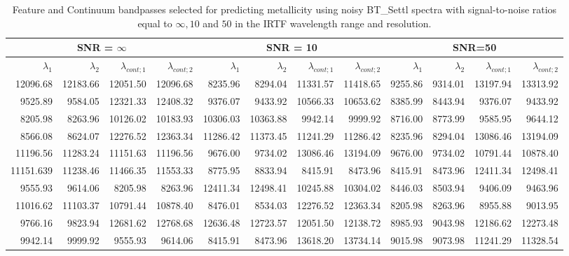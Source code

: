 \begin{table*}
\begin{center}
\begin{tabular}{ rrrr | rrrr | rrrr }
  \hline
  \multicolumn{4}{c}{SNR = $\infty$ } & \multicolumn{4}{c}{SNR = 10} &  \multicolumn{4}{c}{SNR=50} \\
  \hline
$\lambda_1$ & $\lambda_2$ & $\lambda_{cont;1}$ & $\lambda_{cont;2} $ & $\lambda_1$ & $\lambda_2$ & $\lambda_{cont;1}$ & $\lambda_{cont;2} $ & $\lambda_1$ & $\lambda_2$ & $\lambda_{cont;1}$ & $\lambda_{cont;2} $ \\ 
  \hline

     12096.68 & 12183.66  & 12051.50 & 12096.68 & 8235.96  & 8294.04  &	11331.57 & 11418.65 & 9255.86 & 9314.01   &     13197.94 & 13313.92  \\
    9525.89 & 9584.05 	  & 12321.33 & 12408.32 & 9376.07  & 9433.92  &	10566.33 & 10653.62 & 8385.99 & 8443.94   &     9376.07  & 9433.92    \\
     8205.98 & 8263.96 	  & 10126.02 & 10183.93 & 10306.03 & 10363.88 &	 9942.14 & 9999.92  & 8716.00 & 8773.99   &     9585.95  & 9644.12    \\
     8566.08 & 8624.07 	  & 12276.52 & 12363.34 & 11286.42 & 11373.45 &	11241.29 & 11286.42 & 8235.96 & 8294.04   &     13086.46 & 13194.09  \\
     11196.56 & 11283.24  & 11151.63 & 11196.56 & 9676.00  & 9734.02  &	13086.46 & 13194.09 & 9676.00 & 9734.02   &     10791.44 & 10878.40  \\
     11151.639 & 11238.46 & 11466.35 & 11553.33 & 8775.95  & 8833.94  &	8415.91  & 8473.96  & 8415.91 & 8473.96   &     12411.34 & 12498.41  \\
     9555.93 & 9614.06 	  & 8205.98  & 8263.96  & 12411.34 & 12498.41 &	10245.88 & 10304.02 & 8446.03 & 8503.94   &     9406.09  & 9463.96    \\
     11016.62 & 11103.37  & 10791.44 & 10878.40 & 8476.01  & 8534.03  &	12276.52 & 12363.34 & 8205.98 & 8263.96   &     8955.88  & 9013.95    \\
     9766.16 & 9823.94 	  & 12681.62 & 12768.68 & 12636.48 & 12723.57 &	12051.50 & 12138.72 & 8985.93 & 9043.98   &     12186.62 & 12273.48  \\
     9942.14 & 9999.92    & 9555.93  & 9614.06  & 8415.91  & 8473.96  &	13618.20 & 13734.14 & 9015.98 & 9073.98   &     11241.29 & 11328.54  \\

\hline
\end{tabular}
\caption {Feature and Continuum bandpasses selected for predicting metallicity 
      using noisy BT\_Settl spectra with signal-to-noise ratios
      equal to $\infty , 10 $ and $ 50 $ in the IRTF wavelength range
  and resolution.} \label{tab:irtf-met-noisy}
\end{center}
\end{table*}

